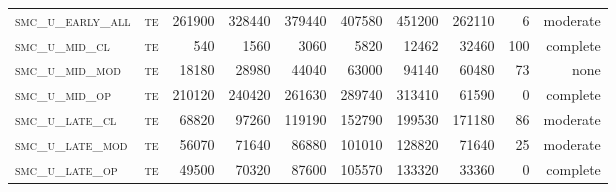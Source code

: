 \begin{landscape}
\begin{center}
\begin{footnotesize}
\begin{longtable}{llrrrrr|rrr}
\textsc{smc\_u\_early\_all} & \textsc{te  	    }   & 261900   & 328440   & 379440   & 407580   & 451200   & 262110        & 6             & moderate        \\
\textsc{smc\_u\_mid\_cl   } & \textsc{te        }   & 540      & 1560     & 3060     & 5820     & 12462    & 32460         & 100           & complete        \\
\textsc{smc\_u\_mid\_mod  } & \textsc{te        }   & 18180    & 28980    & 44040    & 63000    & 94140    & 60480         & 73            & none        \\
\textsc{smc\_u\_mid\_op   } & \textsc{te        }   & 210120   & 240420   & 261630   & 289740   & 313410   & 61590         & 0             & complete            \\
\textsc{smc\_u\_late\_cl  } & \textsc{te        }   & 68820    & 97260    & 119190   & 152790   & 199530   & 171180        & 86            & moderate        \\
\textsc{smc\_u\_late\_mod } & \textsc{te        }   & 56070    & 71640    & 86880    & 101010   & 128820   & 71640         & 25            & moderate        \\
\textsc{smc\_u\_late\_op  } & \textsc{te        }   & 49500    & 70320    & 87600    & 105570   & 133320   & 33360         & 0             & complete           


\end{longtable}
\end{footnotesize}
\end{center}
\end{landscape}

\restoregeometry
\pagestyle{headings}


